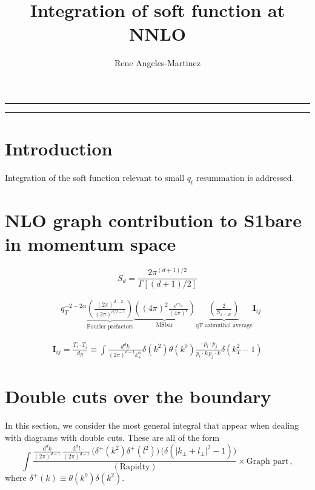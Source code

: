 \documentclass[a4paper,11pt]{article}
\title{Integration of soft function at NNLO}
\author{Rene Angeles-Martinez}
\numberwithin{equation}{section}
\newcommand{\dd}{\text{d}}
\newcommand{\eps}{\epsilon}
\begin{document}
\maketitle

\noindent \rule{\textwidth}{1pt}
\tableofcontents
\noindent \rule{\textwidth}{1pt}

\newpage

\section{Introduction}

Integration of the soft function relevant to small $q_t$ resummation is addressed. 
%

\newpage



\section{NLO graph contribution to S1bare in momentum space}

\begin{equation}
S_{d}= \frac{2\pi^{(d+1)/2}}{\Gamma[(d+1)/2]}
\end{equation}

\begin{align}
& q_T^{-2-2\alpha}
\underbrace{\left( 
\frac{(2\pi)^{d-2}}{(2\pi)^{d/2-1}}\right)}_{\text{Fourier prefactors}}
\underbrace{\left( (4\pi)^2 
\frac{e^{\eps \gamma_E}}{(4\pi)^\eps} \right)}_{\text{MSbar}}
\underbrace{ \left( \frac{2}{S_{1-2\eps}} \right)}_{\text{qT azimuthal average}}
\mathbf{I}_{ij}
\end{align}

\begin{align*}
\mathbf{I}_{ij}=\frac{T_i\cdot T_j}{d_R}\equiv\int 
\frac{d^d k}{(2\pi)^{d-1}k_+^\alpha}\delta(k^2)\theta(k^0)
\frac{-p_i\cdot p_j}{p_i\cdot k\, p_j\cdot k}
\delta(k_T^2-1)
\end{align*}




\section{Double cuts over the boundary}

In this section, we consider the most general integral that appear when dealing with 
diagrams with double cuts. These are all of the form
%
\begin{equation}
  \int \frac{ \frac{\dd^d k}{(2\pi)^{d-1}}\, \frac{\dd^d l}{(2\pi)^{d-1}} \,  \Big( \delta^+(k^2) \delta^+(l^2) \Big) \,
            \Big(\delta(|k_\perp+l_\perp|^2-1)\Big)}{(\text{Rapidty})} \times \text{Graph part}\,,
  \label{eq:master}
\end{equation}
where $\delta^{+}(k)\equiv \theta(k^0)\delta(k^2)$.
%
\end{document}
